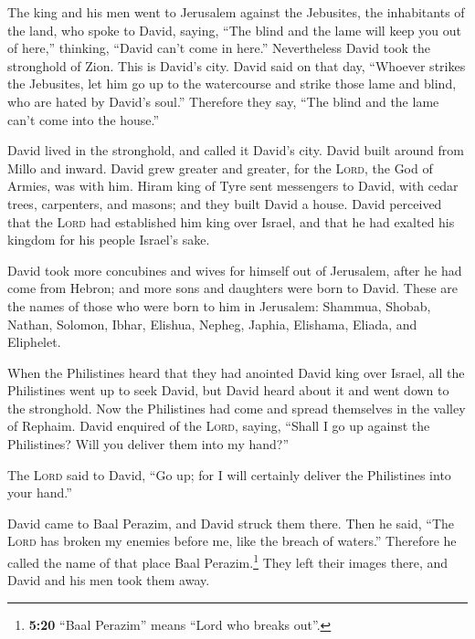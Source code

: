  The king and his men went to Jerusalem against the
Jebusites, the inhabitants of the land, who spoke to David, saying,
``The blind and the lame will keep you out of here,'' thinking, ``David
can't come in here.''  Nevertheless David took the
stronghold of Zion. This is David's city.  David said on
that day, ``Whoever strikes the Jebusites, let him go up to the
watercourse and strike those lame and blind, who are hated by David's
soul.'' Therefore they say, ``The blind and the lame can't come into the
house.''

 David lived in the stronghold, and called it David's
city. David built around from Millo and inward.  David
grew greater and greater, for the \textsc{Lord}, the God of Armies, was
with him.  Hiram king of Tyre sent messengers to David,
with cedar trees, carpenters, and masons; and they built David a house.
 David perceived that the \textsc{Lord} had established
him king over Israel, and that he had exalted his kingdom for his people
Israel's sake.

 David took more concubines and wives for himself out of
Jerusalem, after he had come from Hebron; and more sons and daughters
were born to David.  These are the names of those who
were born to him in Jerusalem: Shammua, Shobab, Nathan, Solomon,
 Ibhar, Elishua, Nepheg, Japhia, 
Elishama, Eliada, and Eliphelet.

 When the Philistines heard that they had anointed David
king over Israel, all the Philistines went up to seek David, but David
heard about it and went down to the stronghold.  Now the
Philistines had come and spread themselves in the valley of Rephaim.
 David enquired of the \textsc{Lord}, saying, ``Shall I
go up against the Philistines? Will you deliver them into my hand?''

The \textsc{Lord} said to David, ``Go up; for I will certainly deliver
the Philistines into your hand.''

 David came to Baal Perazim, and David struck them there.
Then he said, ``The \textsc{Lord} has broken my enemies before me, like
the breach of waters.'' Therefore he called the name of that place Baal
Perazim.\footnote{\textbf{5:20} ``Baal Perazim'' means ``Lord who breaks
  out''.}  They left their images there, and David and
his men took them away.

